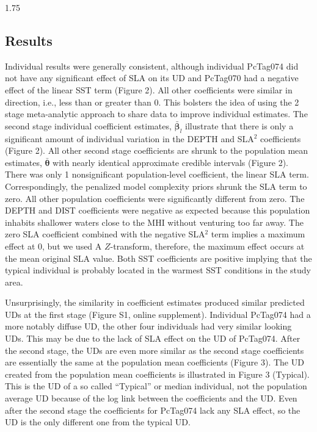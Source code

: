\documentclass[12pt]{article}
\newcommand{\bb}{\ensuremath{\boldsymbol{\beta}}}
\newcommand{\bt}{\ensuremath{\boldsymbol{\theta}}}
\begin{document}
\begin{spacing}{1.75}
\subsection{Results}

Individual results were generally consistent, although individual PcTag074 did not have any significant effect of SLA on its UD and PcTag070 had a negative effect of the linear SST term (Figure 2). All other coefficients were similar in direction, i.e., less than or greater than 0. This bolsters the idea of using the 2 stage meta-analytic approach to share data to improve individual estimates. The second stage individual coefficient estimates, $\bar{\bb}_l$ illustrate that there is only a significant amount of individual variation in the DEPTH and SLA$^2$ coefficients (Figure 2). All other second stage coefficients are shrunk to the population mean estimates, $\bar{\bt}$ with nearly identical approximate credible intervals (Figure 2). There was only 1 nonsignificant population-level coefficient, the linear SLA term. Correspondingly, the penalized model complexity priors shrunk the SLA term to zero. All other population coefficients were significantly different from zero. The DEPTH and DIST coefficients were negative as expected because this population inhabits shallower waters close to the MHI without venturing too far away. The zero SLA coefficient combined with the negative SLA$^2$ term implies a maximum effect at 0, but we used A $Z$-transform, therefore, the maximum effect occurs at the mean original SLA value. Both SST coefficients are positive implying that the typical individual is probably located in the warmest SST conditions in the study area.   

Unsurprisingly, the similarity in coefficient estimates produced similar predicted UDs at the first stage (Figure S1, online supplement). Individual PcTag074 had a more notably diffuse UD, the other four individuals had very similar looking UDs. This may be due to the lack of SLA effect on the UD of PcTag074. After the second stage, the UDs are even more similar as the second stage coefficients are essentially the same at the population mean coefficients (Figure 3). The UD created from the population mean coefficients is illustrated in Figure 3 (Typical). This is the UD of a so called ``Typical'' or median individual, not the population average UD because of the log link between the coefficients and the UD. Even after the second stage the coefficients for PcTag074 lack any SLA effect, so the UD is the only different one from the typical UD.   


\end{spacing}
\end{document}
